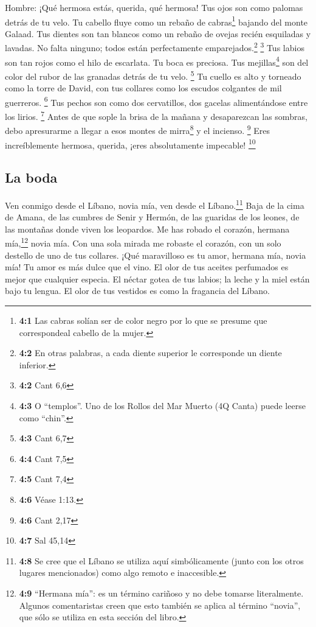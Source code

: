 Hombre:  ¡Qué hermosa estás, querida, qué hermosa! Tus
ojos son como palomas detrás de tu velo. Tu cabello fluye como un rebaño
de cabras\footnote{\textbf{4:1} Las cabras solían ser de color negro por
  lo que se presume que correspondeal cabello de la mujer.} bajando del
monte Galaad.  Tus dientes son tan blancos como un rebaño
de ovejas recién esquiladas y lavadas. No falta ninguno; todos están
perfectamente emparejados.\footnote{\textbf{4:2} En otras palabras, a
  cada diente superior le corresponde un diente inferior.} \footnote{\textbf{4:2}
  Cant 6,6}  Tus labios son tan rojos como el hilo de
escarlata. Tu boca es preciosa. Tus mejillas\footnote{\textbf{4:3} O
  ``templos''. Uno de los Rollos del Mar Muerto (4Q Canta) puede leerse
  como ``chin''.} son del color del rubor de las granadas detrás de tu
velo. \footnote{\textbf{4:3} Cant 6,7}  Tu cuello es alto
y torneado como la torre de David, con tus collares como los escudos
colgantes de mil guerreros. \footnote{\textbf{4:4} Cant 7,5}
 Tus pechos son como dos cervatillos, dos gacelas
alimentándose entre los lirios. \footnote{\textbf{4:5} Cant 7,4}
 Antes de que sople la brisa de la mañana y desaparezcan
las sombras, debo apresurarme a llegar a esos montes de mirra\footnote{\textbf{4:6}
  Véase 1:13.} y el incienso. \footnote{\textbf{4:6} Cant 2,17}
 Eres increíblemente hermosa, querida, ¡eres absolutamente
impecable! \footnote{\textbf{4:7} Sal 45,14}

\hypertarget{la-boda}{%
\subsection{La boda}\label{la-boda}}

 Ven conmigo desde el Líbano, novia mía, ven desde el
Líbano.\footnote{\textbf{4:8} Se cree que el Líbano se utiliza aquí
  simbólicamente (junto con los otros lugares mencionados) como algo
  remoto e inaccesible.} Baja de la cima de Amana, de las cumbres de
Senir y Hermón, de las guaridas de los leones, de las montañas donde
viven los leopardos.  Me has robado el corazón, hermana
mía,\footnote{\textbf{4:9} ``Hermana mía'': es un término cariñoso y no
  debe tomarse literalmente. Algunos comentaristas creen que esto
  también se aplica al término ``novia'', que sólo se utiliza en esta
  sección del libro.} novia mía. Con una sola mirada me robaste el
corazón, con un solo destello de uno de tus collares. 
¡Qué maravilloso es tu amor, hermana mía, novia mía! Tu amor es más
dulce que el vino. El olor de tus aceites perfumados es mejor que
cualquier especia.  El néctar gotea de tus labios; la
leche y la miel están bajo tu lengua. El olor de tus vestidos es como la
fragancia del Líbano.

